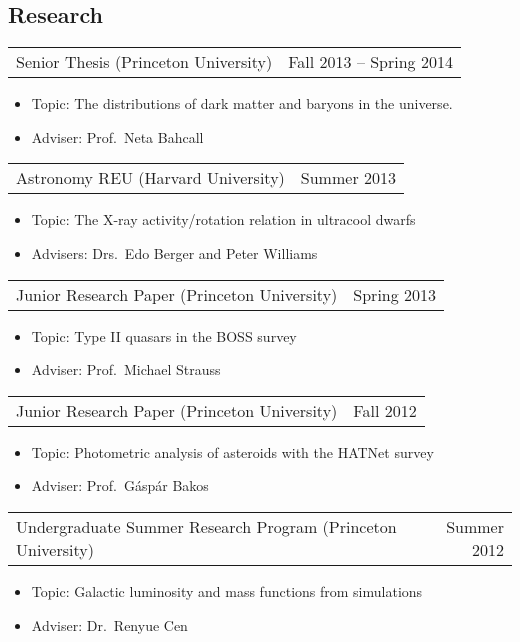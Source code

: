 \documentclass[margin]{res}
\begin{document}
\begin{resume}
\normalsize{\section{Research}}
				 \begin{tabular}{@{}p{4in} r}
				 Senior Thesis (Princeton
                                 University) & Fall 2013 -- Spring
                                 2014
				 \end{tabular}
				 \begin{itemize} \itemsep -2pt
				 \item[] Topic: The distributions of
                                   dark matter and baryons in the
                                   universe.
				 \item[] Adviser: Prof.~Neta Bahcall
				 \end{itemize}
				 \begin{tabular}{@{}p{4in} r}
				 Astronomy REU (Harvard University) &
                                 Summer 2013
				 \end{tabular}
				 \begin{itemize} \itemsep -2pt
				 \item[] Topic: The X-ray
                                   activity/rotation relation in
                                   ultracool dwarfs
				 \item[] Advisers: Drs.~Edo Berger and
                                   Peter Williams
				 \end{itemize}
				 \begin{tabular}{@{}p{4in} r}
				 Junior Research Paper (Princeton
                                 University) & Spring 2013
				 \end{tabular}
				 \begin{itemize} \itemsep -2pt
				 \item[] Topic: Type II quasars in the
                                   BOSS survey
				 \item[] Adviser: Prof.~Michael Strauss
				 \end{itemize}
				 \begin{tabular}{@{}p{4in} r}
				 Junior Research Paper (Princeton
                                 University) & Fall 2012
				 \end{tabular}
				 \begin{itemize} \itemsep -2pt
				 \item[] Topic: Photometric analysis
                                   of asteroids with the HATNet survey
				 \item[] Adviser: Prof.~G\'asp\'ar Bakos
				 \end{itemize}
				 \begin{tabular}{@{}p{4in} r}
				 Undergraduate Summer Research Program
                                 (Princeton University) & Summer 2012
				 \end{tabular}
				 \begin{itemize} \itemsep -2pt
				 \item[] Topic: Galactic luminosity
                                   and mass functions from simulations
				 \item[] Adviser: Dr.~Renyue Cen
				 \end{itemize}


\end{resume}
\end{document}
